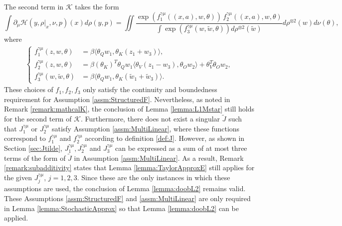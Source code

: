 \documentclass{article}
\begin{document}
\begin{appendices}
The second term in $\mathcal K$ takes the form
\[
\int \partial_\mu \mathcal H(y,\rho|_x,\nu,p)(x)d\rho(y,p) =  \iint \frac{\exp( f^{\gamma \mu}_1((x,a),w,\theta))\, f^{\gamma \mu}_2((x,a),w,\theta)}{\int \exp( f^{\gamma \mu}_3(w,\tilde w, \theta))d\rho^{\otimes 2}(\tilde w)}d\rho^{\otimes 2}(w) d\nu(\theta),
\]
where
\begin{align}\label{eqn:fgmu}
\begin{cases}
    f_1^{\gamma \mu}(z,w,\theta) &=  \beta \langle \theta_Q w_1, \theta_K (z_1+w_3)\rangle,\\
    f_2^{\gamma \mu}(z,w,\theta) &= \beta (\theta_K)^T  \theta_Q w_1 \langle \theta_V (z_1-w_3), \theta_O w_2 \rangle+ \theta_V^T\theta_Ow_2,\\
     f_3^{\gamma \mu}(w,\tilde w,\theta) &=  \beta \langle \theta_Q w_1, \theta_K (\tilde w_1+\tilde w_3)\rangle.
\end{cases}
\end{align}
These choices of $f_1,f_2,f_3$ only satisfy the continuity and boundedness requirement for Assumption \ref{assm:StructuredF}.  
Nevertheless, as noted in Remark \ref{remark:mathcalK}, the conclusion of Lemma \ref{lemma:L1Mstar} still holds for the second term of $\mathcal K$.
Furthermore, there does not exist a singular $\widetilde{J}$ such that $J_1^{\gamma\mu}$ or $J^{\gamma\mu}_2$ satisfy Assumption \ref{assm:MultiLinear}, where these functions correspond to $f_1^{\gamma\mu}$ and $f_2^{\gamma\mu}$ according to definition \eqref{def:J}. However, as shown in Section \ref{sec:Jtilde}, $J_1^{\gamma\mu}, J^{\gamma\mu}_2$ and $J_3^{\gamma\mu}$ can be expressed as a sum of at most three terms of the form of $\widetilde{J}$ in Assumption \ref{assm:MultiLinear}. As a result, Remark \ref{remark:subadditivity} states that Lemma \ref{lemma:TaylorApproxE} still applies for the given $J^{\gamma\mu}_j$, $j=1,2,3$. Since these are the only instances in which these assumptions are used, the conclusion of Lemma \ref{lemma:doobL2} remains valid. These Assumptions \ref{assm:StructuredF} and \ref{assm:MultiLinear} are only required in Lemma \ref{lemma:StochasticApprox} so that  Lemma \ref{lemma:doobL2} can be applied.


\end{appendices}
\end{document}
